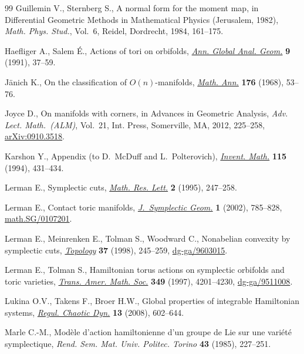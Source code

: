 \begin{thebibliography}{99}
Guillemin V., Sternberg S., A normal form for the moment map, in Dif\/ferential
  Geometric Methods in Mathematical Physics ({J}erusalem, 1982), \textit{Math.
  Phys. Stud.}, Vol.~6, Reidel, Dordrecht, 1984, 161--175.

Haef\/liger A., Salem {\'E}., Actions of tori on orbifolds, \href{http://dx.doi.org/10.1007/BF02411354}{\textit{Ann. Global
  Anal. Geom.}} \textbf{9} (1991), 37--59.

J{\"a}nich K., On the classif\/ication of {$O(n)$}-manifolds, \href{http://dx.doi.org/10.1007/BF02052956}{\textit{Math. Ann.}}
  \textbf{176} (1968), 53--76.

Joyce D., On manifolds with corners, in Advances in Geometric Analysis,
  \textit{Adv. Lect. Math.~(ALM)}, Vol.~21, Int. Press, Somerville, MA, 2012,
  225--258, \href{http://arxiv.org/abs/0910.3518}{arXiv:0910.3518}.

Karshon Y., Appendix (to {D}.~{M}c{D}uf\/f and {L}.~{P}olterovich),
  \href{http://dx.doi.org/10.1007/BF01231767}{\textit{Invent. Math.}} \textbf{115} (1994), 431--434.

Lerman E., Symplectic cuts, \href{http://dx.doi.org/10.4310/MRL.1995.v2.n3.a2}{\textit{Math. Res. Lett.}} \textbf{2} (1995),
  247--258.

Lerman E., Contact toric manifolds, \href{http://dx.doi.org/10.4310/JSG.2001.v1.n4.a6}{\textit{J.~Symplectic Geom.}} \textbf{1}
  (2002), 785--828, \href{http://arxiv.org/abs/math.SG/0107201}{math.SG/0107201}.

Lerman E., Meinrenken E., Tolman S., Woodward C., Nonabelian convexity by
  symplectic cuts, \href{http://dx.doi.org/10.1016/S0040-9383(97)00030-X}{\textit{Topology}} \textbf{37} (1998), 245--259,
  \href{http://arxiv.org/abs/dg-ga/9603015}{dg-ga/9603015}.

Lerman E., Tolman S., Hamiltonian torus actions on symplectic orbifolds and
  toric varieties, \href{http://dx.doi.org/10.1090/S0002-9947-97-01821-7}{\textit{Trans. Amer. Math. Soc.}} \textbf{349} (1997),
  4201--4230, \href{http://arxiv.org/abs/dg-ga/9511008}{dg-ga/9511008}.

Lukina O.V., Takens F., Broer H.W., Global properties of integrable
  {H}amiltonian systems, \href{http://dx.doi.org/10.1134/S1560354708060105}{\textit{Regul. Chaotic Dyn.}} \textbf{13} (2008),
  602--644.

Marle C.-M., Mod\`ele d'action hamiltonienne d'un groupe de {L}ie sur une
  vari\'et\'e symplectique, \textit{Rend. Sem. Mat. Univ. Politec. Torino}
  \textbf{43} (1985), 227--251.


\end{thebibliography}
